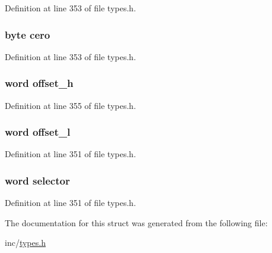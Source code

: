 Definition at line 353 of file types.h.

\hypertarget{struct_d_e_s_c_r___i_n_t_a10e7734359849a8225562be7f834bf5e}{
\subsubsection[{cero}]{\setlength{\rightskip}{0pt plus 5cm}byte {\bf cero}}}
\label{struct_d_e_s_c_r___i_n_t_a10e7734359849a8225562be7f834bf5e}


Definition at line 353 of file types.h.

\hypertarget{struct_d_e_s_c_r___i_n_t_a95502551327cda03ecf9272bef03280e}{
\subsubsection[{offset\_\-h}]{\setlength{\rightskip}{0pt plus 5cm}word {\bf offset\_\-h}}}
\label{struct_d_e_s_c_r___i_n_t_a95502551327cda03ecf9272bef03280e}


Definition at line 355 of file types.h.

\hypertarget{struct_d_e_s_c_r___i_n_t_ad333e6d5d9cab6ad3726a313057c04b4}{
\subsubsection[{offset\_\-l}]{\setlength{\rightskip}{0pt plus 5cm}word {\bf offset\_\-l}}}
\label{struct_d_e_s_c_r___i_n_t_ad333e6d5d9cab6ad3726a313057c04b4}


Definition at line 351 of file types.h.

\hypertarget{struct_d_e_s_c_r___i_n_t_a8abb596f01128e9ee829157242ac3275}{
\subsubsection[{selector}]{\setlength{\rightskip}{0pt plus 5cm}word {\bf selector}}}
\label{struct_d_e_s_c_r___i_n_t_a8abb596f01128e9ee829157242ac3275}


Definition at line 351 of file types.h.



The documentation for this struct was generated from the following file:\begin{DoxyCompactItemize}
\item 
inc/\hyperlink{types_8h}{types.h}\end{DoxyCompactItemize}
